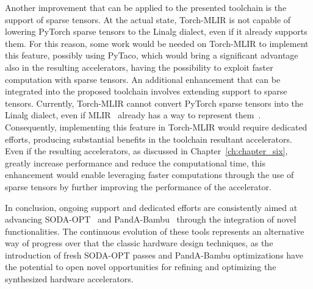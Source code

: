 Another improvement that can be applied to the presented toolchain is the support of sparse tensors.
At the actual state, Torch-MLIR is not capable of lowering PyTorch sparse tensors to the Linalg dialect, even if it already supports them.
For this reason, some work would be needed on Torch-MLIR to implement this feature, possibly using PyTaco, which would bring a significant advantage also in the resulting accelerators, having the possibility to exploit faster computation with sparse tensors.
An additional enhancement that can be integrated into the proposed toolchain involves extending support to sparse tensors.
Currently, Torch-MLIR cannot convert PyTorch sparse tensors into the Linalg dialect, even if MLIR~\cite{9370308} already has a way to represent them~\cite{Bik_2022}.
Consequently, implementing this feature in Torch-MLIR would require dedicated efforts, producing substantial benefits in the toolchain resultant accelerators.
Even if the resulting accelerators, as discussed in Chapter~\ref{ch:chapter_six}, greatly increase performance and reduce the computational time, this enhancement would enable leveraging faster computations through the use of sparse tensors by further improving the performance of the accelerator.

In conclusion, ongoing support and dedicated efforts are consistently aimed at advancing SODA-OPT~\cite{9786533} and PandA-Bambu~\cite{9586110} through the integration of novel functionalities.
The continuous evolution of these tools represents an alternative way of progress over that the classic hardware design techniques, as the introduction of fresh SODA-OPT passes and PandA-Bambu optimizations have the potential to open novel opportunities for refining and optimizing the synthesized hardware accelerators.